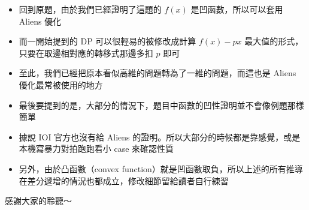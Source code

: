 \documentclass[standalone]{beamer}
\begin{document}
\begin{frame}{}
  \begin{itemize}
    \item 回到原題，由於我們已經證明了這題的 $f(x)$ 是凹函數，所以可以套用 Aliens 優化
    \item 而一開始提到的 DP 可以很輕易的被修改成計算 $f(x) - px$ 最大值的形式，只要在取邊相對應的轉移式那邊多扣 $p$ 即可
    \item 至此，我們已經把原本看似高維的問題轉為了一維的問題，而這也是 Aliens 優化最常被使用的地方
    \item 最後要提到的是，大部分的情況下，題目中函數的凹性證明並不會像例題那樣簡單
    \item 據說 IOI 官方也沒有給 Aliens 的證明。所以大部分的時候都是靠感覺，或是本機寫暴力對拍跑跑看小 case 來確認性質
    \item 另外，由於凸函數（convex function）就是凹函數取負，所以上述的所有推導在差分遞增的情況也都成立，修改細節留給讀者自行練習
  \end{itemize}
\end{frame}

\begin{frame}
  感謝大家的聆聽～
\end{frame}
\end{document}
